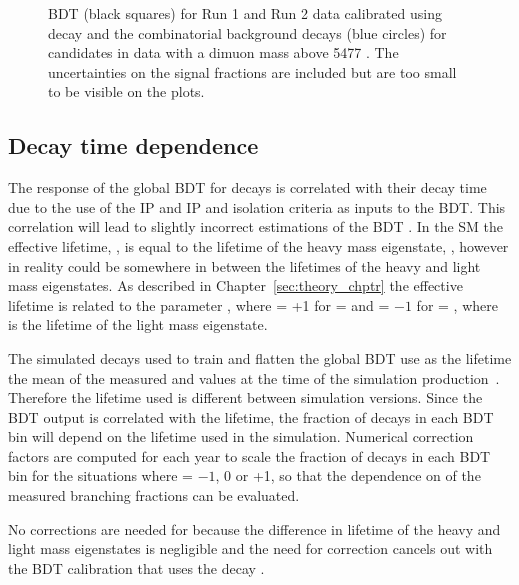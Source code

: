 \begin{figure}[tbp]
\begin{subfigure}[b]{0.48\textwidth}
   \end{subfigure}
    \caption{\bmumu BDT \pdfs (black squares) for Run 1 and Run 2 data calibrated using \bdkpi decay and the combinatorial background decays (blue circles) for \bmumu candidates in data with a dimuon mass above 5477 \mevcc. The uncertainties on the signal fractions are included but are too small to be visible on the plots. }
    \label{fig:BDTpdfs}
\end{figure}


\subsection{Decay time dependence}%
\label{sec:ADGBDTcorrections}
The response of the global BDT for \bmumu decays is correlated with their decay time due to the use of the \bs IP and IP \chisqd and isolation criteria as inputs to the BDT. This correlation will lead to slightly incorrect estimations of the \bsmumu BDT \pdf. In the SM the \bsmumu effective lifetime, \tmumu, is equal to the lifetime of the heavy \bs mass eigenstate, \tH, however in reality \tmumu could be somewhere in between the lifetimes of the heavy and light mass eigenstates. As described in Chapter~\ref{sec:theory_chptr} the \bsmumu effective lifetime is related to the parameter \ADG, where \ADG = +1 for \tmumu = \tH and \ADG = $-1$ for \tmumu = \tL, where \tL is the lifetime of the light \bsmumu mass eigenstate.

The simulated decays used to train and flatten the global BDT use as the \bsmumu lifetime the mean of the measured \tH and \tL values at the time of the simulation production~\cite{Olive:2016xmw}. Therefore the lifetime used is different between simulation versions. Since the BDT output is correlated with the lifetime, the fraction of \bsmumu decays in each BDT bin will depend on the lifetime used in the simulation. Numerical correction factors are computed for each year to scale the fraction of \bsmumu decays in each BDT bin for the situations where \ADF = $-1$, 0 or +1, so that the dependence on \ADG of the measured branching fractions can be evaluated.

No corrections are needed for \bdmumu because the difference in lifetime of the heavy and light \bd mass eigenstates is negligible and the need for correction cancels out with the BDT calibration that uses the \bd decay \bdkpi. 


